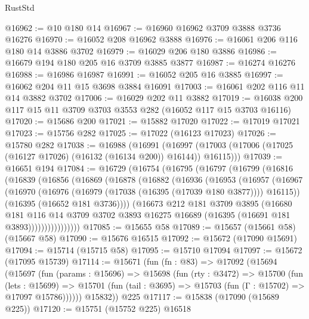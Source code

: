 \begin{lexlean}{RustStd}
\begin{coremodule}
@16962 := @10 @180 @14
@16967 := @16960 @16962 @3709 @3888 @3736 @16276
@16970 := @16052 @208 @16962 @3888
@16976 := @16061 @206 @116 @180 @14 @3886 @3702
@16979 := @16029 @206 @180 @3886
@16986 := @16679 @194 @180 @205 @16 @3709 @3885 @3877
@16987 := @16274 @16276
@16988 := @16986 @16987
@16991 := @16052 @205 @16 @3885
@16997 := @16062 @204 @11 @15 @3698 @3884 @16091
@17003 := @16061 @202 @116 @11 @14 @3882 @3702
@17006 := @16029 @202 @11 @3882
@17019 := @16038 @200 @117 @15 @11 @3709 @3703 @3553 @282 (@16052 @117 @15 @3703 @16116)
@17020 := @15686 @200
@17021 := @15882 @17020
@17022 := @17019 @17021
@17023 := @15756 @282
@17025 := @17022 (@16123 @17023)
@17026 := @15780 @282
@17038 := @16988
    (@16991
      (@16997 (@17003 (@17006 (@17025 (@16127 @17026) (@16132 (@16134 @200)) @16144)) @16115)))
@17039 := @16651 @194
@17084 := @16729
    (@16754
      (@16795
        (@16797
          (@16799
            (@16816
              (@16839
                (@16856
                  (@16869
                    (@16878
                      (@16882
                        (@16936
                          (@16953
                            (@16957
                              (@16967
                                (@16970
                                  (@16976 (@16979 (@17038 (@16395 (@17039 @180 @3877)))) @16115))
                                (@16395 (@16652 @181 @3736))))
                            (@16673
                              @212
                              @181
                              @3709
                              @3895
                              (@16680
                                @181
                                @116
                                @14
                                @3709
                                @3702
                                @3893
                                @16275
                                @16689
                                (@16395 (@16691 @181 @3893))))))))))))))))
@17085 := @15655 @58
@17089 := @15657 (@15661 @58) (@15667 @58)
@17090 := @15676 @16515
@17092 := @15672 (@17090 @15691)
@17094 := @15714 (@15715 @58)
@17095 := @15710 @17094
@17097 := @15672 (@17095 @15739)
@17114 := @15671
    (fun (fn : @83) =>
    @17092
      (@15694
        (@15697
          (fun (params : @15696) =>
          @15698
            (fun (rty : @3472) =>
            @15700
              (fun (lets : @15699) =>
              @15701 (fun (tail : @3695) => @15703 (fun (Γ : @15702) => @17097 @15786))))))
        @15832))
    @225
@17117 := @15838 (@17090 (@15689 @225))
@17120 := @15751 (@15752 @225) @16518

\end{coremodule}
\end{lexlean}
